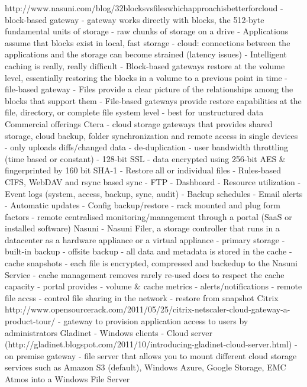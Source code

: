 			http://www.nasuni.com/blog/32blocksvsfileswhichapproachisbetterforcloud
				- block-based gateway
					- gateway works directly with blocks, the 512-byte fundamental units of storage
					- raw chunks of storage on a drive
					- Applications assume that blocks exist in local, fast storage
						- cloud: connections between the applications and the storage can become strained (latency issues)
					- Intelligent caching is really, really difficult 
					- Block-based gateways restore at the volume level, essentially restoring the blocks in a volume to a previous point in time
				- file-based gateway
					- Files provide a clear picture of the relationships among the blocks that support them
					- File-based gateways provide restore capabilities at the file, directory, or complete file system level
					- best for unstructured data
		Commercial offerings
			Ctera
				- cloud storage gateways that provides shared storage, cloud backup, folder synchronization and remote access in single devices
					- only uploads diffs/changed data
					- de-duplication
					- user bandwidth throttling (time based or constant)
					- 128-bit SSL
					- data encrypted using 256-bit AES & fingerprinted by 160 bit SHA-1
					- Restore all or individual files
					- Rules-based CIFS, WebDAV and rsync based sync
					- FTP
					- Dashboard
						- Resource utilization
						- Event logs (system, access, backup, sync, audit)
						- Backup schedules
					- Email alerts
					- Automatic updates
					- Config backup/restore
				- rack mounted and plug form factors
				- remote centralised monitoring/management through a portal (SaaS or installed software)
			Nasuni
				- Nasuni Filer, a storage controller that runs in a datacenter as a hardware appliance or a virtual appliance
					- primary storage
					- built-in backup
					- offsite backup
					- all data and metadata is stored in the cache
					- cache snapshots
						- each file is encrypted, compressed and backedup to the Nasuni Service
					- cache management removes rarely re-used docs to respect the cache capacity
				- portal provides
					- volume & cache metrics
					- alerts/notifications
					- remote file accss
					- control file sharing in the network
					- restore from snapshot
			Citrix
			http://www.opensourcerack.com/2011/05/25/citrix-netscaler-cloud-gateway-a-product-tour/
				- gateway to provision application access to users by administrators
			Gladinet 
				- Windows clients
				- Cloud server (http://gladinet.blogspot.com/2011/10/introducing-gladinet-cloud-server.html)
					- on premise gateway
					- file server that allows you to mount different cloud storage services such as Amazon S3 (default), Windows Azure, Google Storage, EMC Atmos into a Windows File Server
